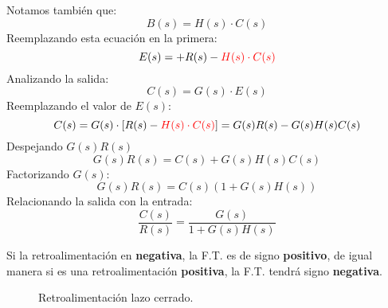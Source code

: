 \documentclass[
	12pt, %
	fleqn, %
	a4paper, %
	oneside, %
]{LegrandOrangeBook}
\begin{document}
Notamos también que:
\begin{equation}
B(s)=H(s)\cdot C(s)
\end{equation}
Reemplazando esta ecuación en la primera:
\begin{equation}
E(s)=+R(s)-\textcolor{red}{H(s)\cdot C(s)}
\end{equation}
Analizando la salida:
\begin{equation}
C(s)=G(s)\cdot E(s)
\end{equation}
Reemplazando el valor de $E(s)$:
\begin{equation}
C(s)=G(s)\cdot\left[R(s)-\textcolor{red}{H(s)\cdot C(s)}\right]=G(s)R(s)-G(s)H(s)C(s)
\end{equation}
Despejando $G(s)R(s)$
\begin{equation}
G(s)R(s)=C(s)+G(s)H(s)C(s)
\end{equation}
Factorizando $G(s)$:
\begin{equation}
G(s)R(s)=C(s)(1+G(s)H(s))
\end{equation}
Relacionando la salida con la entrada:
\begin{equation}
\frac{C(s)}{R(s)}=\frac{G(s)}{1+G(s)H(s)}	
\end{equation}
\begin{notation}
Si la retroalimentación en \textbf{negativa}, la F.T. es de signo \textbf{positivo}, de igual manera si es una retroalimentación \textbf{positiva}, la F.T. tendrá signo \textbf{negativa}.
\begin{figure}[H]
\centering
{}
\caption{Retroalimentación lazo cerrado.}
\end{figure}
\end{notation}
\end{document}

